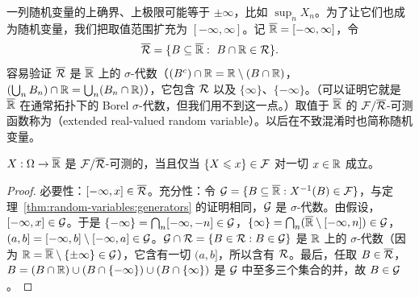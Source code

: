 
一列随机变量的上确界、上极限可能等于 $\pm\infty$，比如 $\sup_nX_n$。为了让它们也成为随机变量，我们把取值范围扩充为 $[-\infty,\infty]$。记 $\overline{\mathbb{R}}=[-\infty,\infty]$，令
\[
\overline\cR=\{B\subseteq\overline\R:\ B\cap\R\in\cR\}.
\]
容易验证 $\overline{\mathcal{R}}$ 是 $\overline{\mathbb{R}}$ 上的 $\sigma$-代数（$(B^c)\cap\mathbb{R}=\mathbb{R}\setminus(B\cap\mathbb{R})$，$(\bigcup_nB_n)\cap\mathbb{R}=\bigcup_n(B_n\cap\mathbb{R})$），它包含 $\mathcal{R}$ 以及 $\{\infty\}$、$\{-\infty\}$。（可以证明它就是 $\overline{\mathbb{R}}$ 在通常拓扑下的 Borel $\sigma$-代数，但我们用不到这一点。）取值于 $\overline{\mathbb{R}}$ 的 $\mathcal{F}/\overline{\mathcal{R}}$-可测函数称为（extended real-valued random variable）。以后在不致混淆时也简称随机变量。

\begin{proposition}\label{prop:random-variables:extended}
$X:\Omega\to\overline{\mathbb{R}}$ 是 $\mathcal{F}/\overline{\mathcal{R}}$-可测的，当且仅当 $\{X\leqslant x\}\in\mathcal{F}$ 对一切 $x\in\mathbb{R}$ 成立。
\end{proposition}
\begin{proof}
必要性：$[-\infty,x]\in\overline{\mathcal{R}}$。充分性：令 $\mathcal{G}=\{B\subseteq\overline{\mathbb{R}}: X^{-1}(B)\in\mathcal{F}\}$，与定理~\ref{thm:random-variables:generators} 的证明相同，$\mathcal{G}$ 是 $\sigma$-代数。由假设，$[-\infty,x]\in\mathcal{G}$。于是 $\{-\infty\}=\bigcap_n[-\infty,-n]\in\mathcal{G}$，$\{\infty\}=\bigcap_n(\overline{\mathbb{R}}\setminus[-\infty,n])\in\mathcal{G}$，$(a,b]=[-\infty,b]\setminus[-\infty,a]\in\mathcal{G}$。$\mathcal{G}\cap\mathcal{R}=\{B\in\mathcal{R}: B\in\mathcal{G}\}$ 是 $\mathbb{R}$ 上的 $\sigma$-代数（因为 $\mathbb{R}=\overline{\mathbb{R}}\setminus\{\pm\infty\}\in\mathcal{G}$），它含有一切 $(a,b]$，所以含有 $\mathcal{R}$。最后，任取 $B\in\overline{\mathcal{R}}$，$B=(B\cap\mathbb{R})\cup(B\cap\{-\infty\})\cup(B\cap\{\infty\})$ 是 $\mathcal{G}$ 中至多三个集合的并，故 $B\in\mathcal{G}$。
\end{proof}

